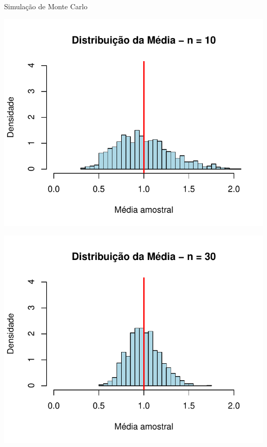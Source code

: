 \documentclass[aspectratio=169,14pt]{beamer}
\begin{document}
\begin{frame}{Simulação de Monte Carlo}
    \centering
    \begin{minipage}{0.31\textwidth}
        \includegraphics[width=\linewidth]{hist/hist_exp_n10.pdf}
    \end{minipage}
    \begin{minipage}{0.31\textwidth}
        \includegraphics[width=\linewidth]{hist/hist_exp_n30.pdf}
    \end{minipage}\\
    \begin{minipage}{0.31\textwidth}

\end{minipage}
\end{frame}
\end{document}
